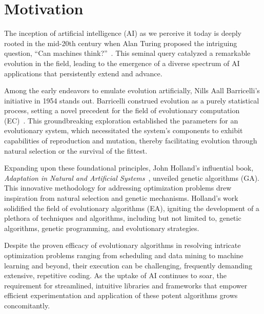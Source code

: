 \section{Motivation}
\label{sec:motivation}
  The inception of artificial intelligence (AI) as we perceive it today is deeply rooted in the mid-20th century when 
  Alan Turing proposed the intriguing question, \enquote{Can machines 
  think?}~\autocite{turingCOMPUTINGMACHINERYINTELLIGENCE1950a}. This seminal query catalyzed a remarkable evolution in 
  the field, leading to the emergence of a diverse spectrum of AI applications that persistently extend and advance.

  Among the early endeavors to emulate evolution artificially, Nills Aall Barricelli's initiative in 1954 stands out.
  Barricelli construed evolution as a purely statistical process, setting a novel precedent for the field of 
  evolutionary computation (EC)~\autocite{barricelliNumericalTestingEvolution1962}. This groundbreaking exploration 
  established the parameters for an evolutionary system, which necessitated the system's components to exhibit 
  capabilities of reproduction and mutation, thereby facilitating evolution through natural selection or the survival 
  of the fittest.

  Expanding upon these foundational principles, John Holland's influential book, \emph{Adaptation in Natural and 
  Artificial Systems}~\autocite{hollandAdaptationNaturalArtificial1992a}, unveiled genetic algorithms (GA). This 
  innovative methodology for addressing optimization problems drew inspiration from natural selection and genetic 
  mechanisms. Holland's work solidified the field of evolutionary algorithms (EA), igniting the development of a 
  plethora of techniques and algorithms, including but not limited to, genetic algorithms, genetic programming, and 
  evolutionary strategies.

  Despite the proven efficacy of evolutionary algorithms in resolving intricate optimization problems ranging from 
  scheduling and data mining to machine learning and beyond, their execution can be challenging, frequently demanding 
  extensive, repetitive coding. As the uptake of AI continues to soar, the requirement for streamlined,  intuitive 
  libraries and frameworks that empower efficient experimentation and application of these potent algorithms grows 
  concomitantly.

